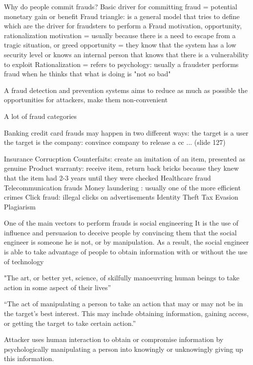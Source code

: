 Why do people commit frauds?
    Basic driver for committing fraud = potential monetary gain or benefit
    Fraud triangle: is a general model that tries to define which are the driver for fraudsters to perform a Fraud
        motivation, opportunity, rationalization
        motivation = usually because there is a need to escape from a tragic situation, or greed 
        opportunity = they know that the system has a low security level or knows an internal person that knows that there is a vulnerability to exploit 
        Rationalization = refers to psychology: usually a fraudster performs fraud when he thinks that what is doing is "not so bad"

A fraud detection and prevention systems aims to reduce as much as possible the opportunities for attackers, make them non-convenient

A lot of fraud categories

Banking credit card frauds
    may happen in two different ways:
        the target is a user 
        the target is the company: convince company to release a cc ... (slide 127)

Insurance 
Corrucption
Counterfaits: create an imitation of an item, presented as genuine
Product warranty: receive item, return back bricks because they knew that the item had 2-3 years until they were checked 
Healthcare fraud 
Telecommunication frauds
Money laundering : usually one of the more efficient crimes 
Click fraud: illegal clicks on advertisements 
Identity Theft 
Tax Evasion
Plagiarism

One of the main vectors to perform frauds is social engineering
    It is the use of influence and persuasion to deceive
    people by convincing them that the social engineer is someone he
    is not, or by manipulation. As a result, the social engineer is able to
    take advantage of people to obtain information with or without the
    use of technology

    "The art, or better yet, science, of skilfully manoeuvring human
    beings to take action in some aspect of their lives”

    “The act of manipulating a person to take an action that
    may or may not be in the target’s best interest. This may
    include obtaining information, gaining access, or getting the
    target to take certain action.”

    Attacker uses human interaction to obtain or compromise
    information by psychologically manipulating a person into
    knowingly or unknowingly giving up this information.

